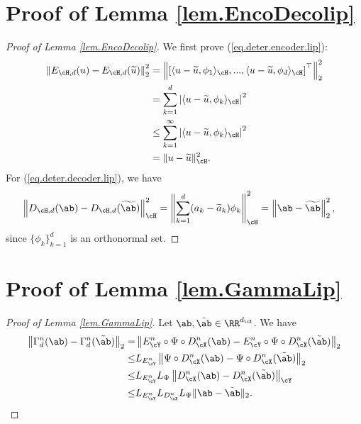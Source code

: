 \documentclass[11pt]{article} %
\begin{document}
\section{Proof of Lemma \ref{lem.EncoDecolip}}
\label{lem.EncoDecolip.proof} 
\begin{proof}[Proof of Lemma \ref{lem.EncoDecolip}]
	We first prove (\ref{eq.deter.encoder.lip}):
	\begin{align*}
		\left\|E_{\cH,d}(u)-E_{\cH,d}(\widetilde{u})\right\|_2^2&=\left\|\left[\langle u-\widetilde{u},\phi_1\rangle_{\cH},...,\langle u-\widetilde{u},\phi_d\rangle_{\cH} \right]^{\top}\right\|_{2}^2\\
		&= \sum_{k=1}^d \left| \langle u-\widetilde{u},\phi_k\rangle_{\cH} \right|^2\\
		&\leq \sum_{k=1}^{\infty}  \left| \langle u-\widetilde{u},\phi_k\rangle_{\cH} \right|^2\\
		&= \|u-\widetilde{u}\|_{\cH}^2.
	\end{align*}	
	For (\ref{eq.deter.decoder.lip}), we have
	\begin{align*}
		\left\|D_{\cH,d}(\ab)- D_{\cH,d}(\widetilde{\ab})\right\|_{\cH}^2&=\left\|\sum_{k=1}^d (a_k-\widetilde{a}_k)\phi_k\right\|_{\cH}^2
		=\left\|\ab-\widetilde{\ab}\right\|_2^2,
	\end{align*}
	since $\{\phi_k\}_{k=1}^d$ is an orthonormal set.
\end{proof}

\section{Proof of Lemma \ref{lem.GammaLip}}
\label{lem.GammaLip.proof}
\begin{proof}[Proof of Lemma \ref{lem.GammaLip}]
	Let $\ab,\tilde{\ab}\in \RR^{d_{\cX}}$. We have
	\begin{align}
		\left\|\Gamma_d^n(\ab)-\Gamma_d^n(\tilde{\ab})\right\|_2=&\left\|E_{\cY}^n\circ \Psi\circ D_{\cX}^n(\ab)-E_{\cY}^n\circ \Psi\circ D_{\cX}^n(\tilde{\ab})\right\|_2 \nonumber\\
		\leq &L_{E^n_{\cY}}\left\|\Psi\circ D_{\cX}^n(\ab)- \Psi\circ D_{\cX}^n(\tilde{\ab})\right\|_2 \nonumber\\
		\leq & L_{E^n_{\cY}}L_{\Psi}\left\|D_{\cX}^n(\ab)-  D_{\cX}^n(\tilde{\ab})\right\|_{\cY} \nonumber\\
		\leq& L_{E^n_{\cY}}L_{D^n_{\cX}}L_{\Psi}\|\ab-\tilde{\ab}\|_2.
	\end{align}
\end{proof}
\end{document}
